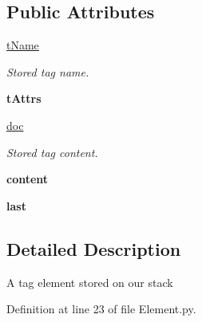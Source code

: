 \subsection*{Public Attributes}
\begin{DoxyCompactItemize}
\item 
\hypertarget{classElement_1_1Element_a4729b44d681267785171f594798a4b18}{
\hyperlink{classElement_1_1Element_a4729b44d681267785171f594798a4b18}{tName}}
\label{classElement_1_1Element_a4729b44d681267785171f594798a4b18}

\begin{DoxyCompactList}\small\item\em Stored tag name. \item\end{DoxyCompactList}\item 
\hypertarget{classElement_1_1Element_abe80105d47b38b08c866d66cba5e361c}{
{\bfseries tAttrs}}
\label{classElement_1_1Element_abe80105d47b38b08c866d66cba5e361c}

\item 
\hypertarget{classElement_1_1Element_a44f8f4eb9a4584267749534b65d50e49}{
\hyperlink{classElement_1_1Element_a44f8f4eb9a4584267749534b65d50e49}{doc}}
\label{classElement_1_1Element_a44f8f4eb9a4584267749534b65d50e49}

\begin{DoxyCompactList}\small\item\em Stored tag content. \item\end{DoxyCompactList}\item 
\hypertarget{classElement_1_1Element_af672c1031cebcdfbe6f1aed263eab0fb}{
{\bfseries content}}
\label{classElement_1_1Element_af672c1031cebcdfbe6f1aed263eab0fb}

\item 
\hypertarget{classElement_1_1Element_a61228f20b35d5eda65d64cb1250c12f2}{
{\bfseries last}}
\label{classElement_1_1Element_a61228f20b35d5eda65d64cb1250c12f2}

\end{DoxyCompactItemize}


\subsection{Detailed Description}
\begin{DoxyVerb}A tag element stored on our stack  \end{DoxyVerb}
 

Definition at line 23 of file Element.py.

